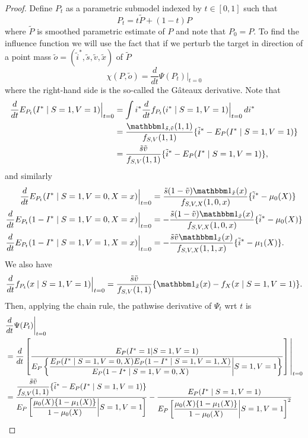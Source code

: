 \begin{appendix}
\begin{proof}
    Define $P_t$ as a parametric submodel indexed by $t \in [0,1]$ such that
    $$P_t = t \widetilde{P} + (1 - t)P$$
    where $\widetilde{P}$ is smoothed parametric estimate of $P$ and note that $P_0 = P$. To find the influence function we will use the fact that if we perturb the target in direction of a point mass $\widetilde{o} = (\widetilde{i}^*, \widetilde{s}, \widetilde{v}, \widetilde{x})$ of $\widetilde{P}$
    $$ \chi(P, \widetilde{o}) = \frac{d}{dt} \Psi(P_t)\bigg\vert_{t=0}$$
    where the right-hand side is the so-called the G\^{a}teaux derivative. Note that
    \begin{align*}
        \dfrac{d}{dt}E_{P_t}(I^*\mid S=1, V=1)\Big\rvert_{t=0} &= \int i^* \dfrac{d}{dt}f_{P_t}(i^*\mid S=1, V=1)\Big\rvert_{t=0} \,di^*\\
        &= \dfrac{\mathbbm 1_{\tilde s,\tilde v}(1, 1)}{f_{S, V}(1, 1)}\{\tilde i^* - E_P(I^*\mid S=1, V=1)\}\\
        &= \dfrac{\tilde s\tilde v}{f_{S, V}(1, 1)}\{\tilde i^* - E_P(I^*\mid S=1, V=1)\},
    \end{align*}
    and similarly
    \begin{align*}
        \dfrac{d}{dt}E_{P_t}(I^*\mid S=1, V=0, X=x)\Big\rvert_{t=0} &= \dfrac{\tilde s(1-\tilde v)\mathbbm 1_{\tilde x}(x)}{f_{S, V, X}(1, 0, x)}\{\tilde i^* - \mu_0(X)\}\\
         \dfrac{d}{dt}E_{P_t}(1-I^*\mid S=1, V=0, X=x)\Big\rvert_{t=0} &= -\dfrac{\tilde s(1-\tilde v)\mathbbm 1_{\tilde x}(x)}{f_{S, V, X}(1, 0, x)}\{\tilde i^* -\mu_0(X)\}\\
         \dfrac{d}{dt}E_{P_t}(1-I^*\mid S=1, V=1, X=x)\Big\rvert_{t=0} &= -\dfrac{\tilde s\tilde v\mathbbm 1_{\tilde x}(x)}{f_{S, V, X}(1, 1, x)}\{\tilde i^* - \mu_1(X)\}.
    \end{align*}
We also have
$$\dfrac{d}{dt}f_{P_t}(x\mid S=1, V=1)\Big\vert_{t=0} = \dfrac{\tilde s \tilde v}{f_{S, V}(1, 1)}\{\mathbbm 1_{\tilde x}(x)-f_X(x\mid S=1, V=1)\}.$$
Then, applying the chain rule, the pathwise derivative of $\Psi_t$ wrt $t$ is
\begin{align*}
   &\frac{d}{dt} \Psi(P_t)\bigg\vert_{t=0} \\
   &= \frac{d}{dt} \left[\dfrac{E_P(I^* = 1 | S = 1, V = 1)}{E_P\left\{\dfrac{E_P(I^*\mid S=1, V=0, X)E_P(1 - I^*\mid S=1, V=1, X)}{E_P(1 - I^*\mid S=1, V=0, X)} \bigg| S=1, V=1\right\}}\right] \vast\vert_{t=0}  \\
   &= \dfrac{\dfrac{\tilde s\tilde v}{f_{S, V}(1, 1)}\{\tilde i^* - E_P(I^*\mid S=1, V=1)\}}{E_P\left[\dfrac{\mu_0(X)\{1-\mu_1(X)\}}{1-\mu_0(X)} \bigg| S=1, V=1\right]} - \dfrac{E_P(I^*\mid S=1, V=1)}{E_P\left[\dfrac{\mu_0(X)\{1-\mu_1(X)\}}{1-\mu_0(X)}\bigg| S=1, V=1\right]^2} \\

\end{align*}
\end{proof}
\end{appendix}
